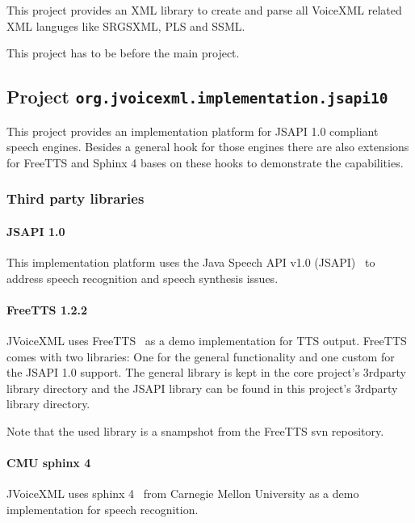 \documentclass[11pt,a4paper]{article}
\begin{document}
This project provides an XML library to create and parse all VoiceXML related
XML languges like SRGSXML, PLS and SSML.

This project has to be before the main project.

\subsection{Project \lstinline{org.jvoicexml.implementation.jsapi10}}

This project provides an implementation platform for JSAPI 1.0 compliant
speech engines. Besides a general hook for those engines there are also
extensions for FreeTTS and Sphinx 4 bases on these hooks to demonstrate the
capabilities.

\subsubsection{Third party libraries}
\label{sec:jsapi10-third-party-libr}

\paragraph{JSAPI 1.0}

This implementation platform uses the Java Speech API v1.0
(JSAPI)~\cite{sun:jsapi} to address speech recognition and speech synthesis
issues.

\paragraph{FreeTTS 1.2.2}
\label{sec:freetts}

JVoiceXML uses FreeTTS~\cite{freetts} as a demo implementation for TTS output.
FreeTTS comes with two libraries: One for the general functionality and one
custom for the JSAPI 1.0 support.
The general library is kept in the core project's 3rdparty library directory
and the JSAPI library can be found in this project's 3rdparty library directory.

Note that the used library is a snampshot from the FreeTTS svn repository.

\paragraph{CMU sphinx 4}
\label{sec:sphinx}

JVoiceXML uses sphinx 4~\cite{sphinx} from Carnegie Mellon University
as a demo implementation for speech recognition.
\end{document}
